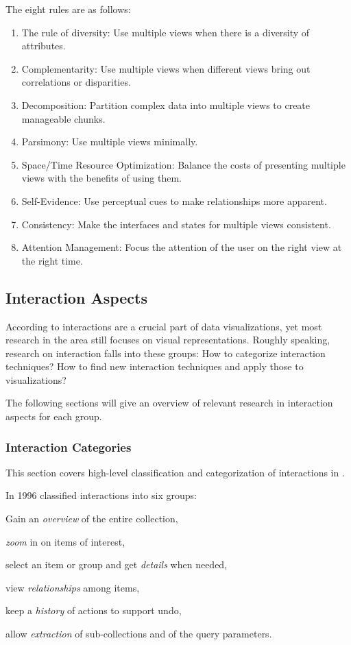 The eight rules are as follows:
\begin{enumerate}
  \item
    The rule of diversity: Use multiple views when there is a diversity of attributes.
  \item
    Complementarity: Use multiple views when different views bring out correlations or disparities.
  \item
    Decomposition: Partition complex data into multiple views to create manageable chunks.
  \item
    Parsimony: Use multiple views minimally.
  \item
    Space/Time Resource Optimization: Balance the costs of presenting multiple views with the benefits of using them.
  \item
    Self-Evidence: Use perceptual cues to make relationships more apparent.
  \item
    Consistency: Make the interfaces and states for multiple views consistent.
  \item
    Attention Management: Focus the attention of the user on the right view at the right time.
\end{enumerate}



\subsection{Interaction Aspects}\label{sec:related-work:cmv:interaction-aspects}
According to \textcite{Ho2013} interactions are a crucial part of data visualizations, yet most research in the area still focuses on visual representations.
Roughly speaking, research on interaction falls into these groups:
How to categorize interaction techniques?
How to find new interaction techniques and apply those to visualizations?

The following sections will give an overview of relevant research in interaction aspects for each group.

\subsubsection{Interaction Categories}\label{sec:related-work:cmv:interaction-aspects:categories}
This section covers high-level classification and categorization of interactions in \cmvs{}.

In 1996 \textcite{Shneiderman1996} classified interactions into six groups:
\begin{enumerate*}[label=(\arabic*)]
  \item
    Gain an \emph{overview} of the entire collection,
  \item
    \emph{zoom} in on items of interest,
  \item
    select an item or group and get \emph{details} when needed,
  \item
    view \emph{relationships} among items,
  \item
    keep a \emph{history} of actions to support undo,
  \item
    allow \emph{extraction} of sub-collections and of the query parameters.
\end{enumerate*}

